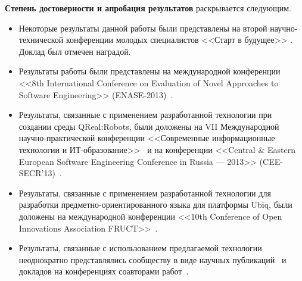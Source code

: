 \textbf{Степень достоверности и апробация результатов} раскрывается следующим.
\begin{itemize}
	\item Некоторые результаты данной работы были представлены на второй 
		научно-технической конференции молодых специалистов <<Старт в будущее>> 
		\cite{kuzenkova2011metamodeling2}. Доклад был отмечен наградой.
	\item Результаты работы были представлены на международной конференции 
		<<8th International Conference on Evaluation of Novel Approaches to Software Engineering>> 
		(ENASE-2013)~.
	\item Результаты, связанные с применением разработанной технологии при 
		создании среды QReal:Robots, были доложены на VII Международной 
		научно-практической конференции <<Современные информационные технологии 
		и ИТ-образование>>~\cite{litvinov2012robots} и на конференции <<Central \& Eastern European
		Software Engineering Conference in Russia --- 2013>> (CEE-SECR'13)~\cite{terekhov2013secr}.
	\item Результаты, связанные с применением разработанной технологии для 
		разработки предметно-ориентированного языка для платформы Ubiq, были доложены 
		на международной конференции <<10th Conference of Open Innovations 
		Association FRUCT>>~\cite{bryksin2011ubiq}.
	\item Результаты, связанные с использованием предлагаемой технологии неоднократно 
		представлялись сообществу в виде научных публикаций~\cite{kuzenkova2011qreal, litvinov2013robots,
		terekhov2013qreal, osechkina2010gestures, terekhov2009architecture}
		и докладов на конференциях соавторами работ~\cite{terekhov2013robots, kuzenkova2013refactoring,
		osechkina2012multistroke, bryksin2011qreal, kuzenkova2011metamodeling, bryksin2011robots}.
\end{itemize}

